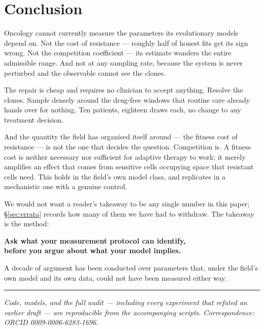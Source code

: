 \documentclass[11pt,a4paper]{article}
\begin{document}
\section{Conclusion}

Oncology cannot currently measure the parameters its evolutionary models depend on. Not
the cost of resistance --- roughly half of honest fits get its sign wrong. Not the
competition coefficient --- its estimate wanders the entire admissible range. And not at
any sampling rate, because the system is never perturbed and the observable cannot see
the clones.

The repair is cheap and requires no clinician to accept anything. Resolve the clones.
Sample densely around the drug-free windows that routine care already hands over for
nothing. Ten patients, eighteen draws each, no change to any treatment decision.

And the quantity the field has organised itself around --- the fitness cost of resistance
--- is not the one that decides the question. Competition is. A fitness cost is neither
necessary nor sufficient for adaptive therapy to work; it merely amplifies an effect that
comes from sensitive cells occupying space that resistant cells need. This holds in the
field's own model class, and replicates in a mechanistic one with a genuine control.

We would not want a reader's takeaway to be any single number in this paper;
\S\ref{sec:errata} records how many of them we have had to withdraw. The takeaway is the method:

\begin{tcolorbox}[keybox]
\begin{center}
\textbf{Ask what your measurement protocol can identify,\\before you argue about what your
model implies.}
\end{center}
\end{tcolorbox}

A decade of argument has been conducted over parameters that, under the field's own model
and its own data, could not have been measured either way.

\vspace{1.5em}
\hrule
\vspace{0.6em}

{\small\itshape Code, models, and the full audit --- including every experiment that
refuted an earlier draft --- are reproducible from the accompanying scripts.
Correspondence: ORCID 0009-0006-6283-1696.}



\end{document}
